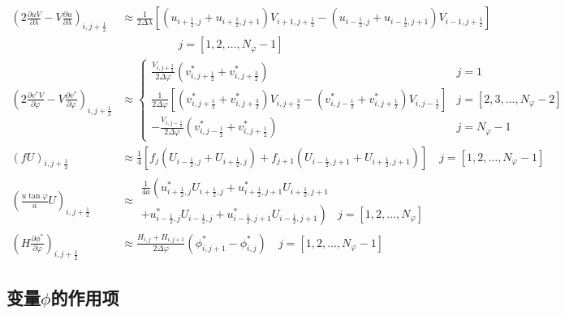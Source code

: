 \documentclass{ctexart}
\begin{document}
\begin{align}
  \left( 2 \frac{\partial u V}{\partial \lambda} - V \frac{\partial u}{\partial \lambda} \right)_{i,j+\frac{1}{2}} & \approx \frac{1}{2 \Delta{\lambda}} \left[ \left( u_{i+\frac{1}{2},j} + u_{i+\frac{1}{2},j+1} \right) V_{i+1,j+\frac{1}{2}}  - \left( u_{i-\frac{1}{2},j} + u_{i-\frac{1}{2},j+1} \right) V_{i-1,j+\frac{1}{2}} \right] \nonumber \\
  & \quad\quad\quad\quad\quad j = [1,2,\dots,N_\varphi - 1] \\
  \left( 2 \frac{\partial v^* V}{\partial \varphi} - V \frac{\partial v^*}{\partial \varphi} \right)_{i,j+\frac{1}{2}} & \approx \left\{
    \begin{array}{ll}
      \frac{V_{i,j+\frac{3}{2}}}{2 \Delta{\varphi}} \left( v_{i,j+\frac{1}{2}}^* + v_{i,j+\frac{3}{2}}^* \right) & j = 1 \\
      \frac{1}{2 \Delta{\varphi}} \left[ \left( v_{i,j+\frac{1}{2}}^* + v_{i,j+\frac{3}{2}}^* \right) V_{i,j+\frac{3}{2}} - \left( v_{i,j-\frac{1}{2}}^* + v_{i,j+\frac{1}{2}}^* \right) V_{i,j-\frac{1}{2}} \right] & j = [2,3,\dots,N_\varphi - 2] \\
      - \frac{V_{i,j-\frac{1}{2}}}{2 \Delta{\varphi}} \left( v_{i,j-\frac{1}{2}}^* + v_{i,j+\frac{1}{2}}^* \right) & j = N_\varphi - 1
    \end{array}
  \right. \\
  \left( f U \right)_{i,j+\frac{1}{2}} & \approx \frac{1}{4} \left[ f_{j} \left( U_{i-\frac{1}{2},j} + U_{i+\frac{1}{2},j} \right) + f_{j+1} \left( U_{i-\frac{1}{2},j+1} + U_{i+\frac{1}{2},j+1} \right) \right] \quad j = [1, 2, \dots, N_\varphi - 1] \\
  \left(\frac{u \tan{\varphi}}{a} U\right)_{i,j+\frac{1}{2}} & \approx
    \begin{array}{ll}
      \frac{1}{4 a} \left( u_{i+\frac{1}{2},j}^* U_{i+\frac{1}{2},j} + u_{i+\frac{1}{2},j+1}^* U_{i+\frac{1}{2},j+1} \right. \\
      \left. + u_{i-\frac{1}{2},j}^* U_{i-\frac{1}{2},j} + u_{i-\frac{1}{2},j+1}^* U_{i-\frac{1}{2},j+1} \right) & j = [1, 2, \dots, N_\varphi]
    \end{array} \\
  \left( H \frac{\partial \phi^*}{\partial \varphi} \right)_{i,j+\frac{1}{2}} & \approx \frac{H_{i,j} + H_{i,j+1}}{2 \Delta{\varphi}} \left( \phi_{i,j+1}^* - \phi_{i,j}^* \right) \quad j = [1, 2, \dots, N_\varphi - 1]
\end{align}

\subsection{变量$\phi$的作用项}
\end{document}
